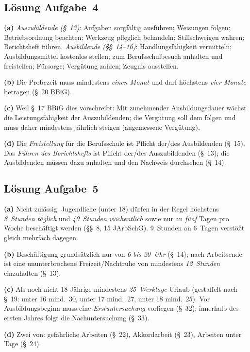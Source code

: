\documentclass[11pt, a4paper]{article}
\begin{document}
\subsection*{Lösung Aufgabe~4}
\begin{loesung}
\textbf{(a)} \emph{Auszubildende (\S~13)}: Aufgaben sorgfältig ausführen; Weisungen folgen;
Betriebsordnung beachten; Werkzeug pfleglich behandeln; Stillschweigen wahren; Berichtsheft
führen. \emph{Ausbildende (\S\S~14--16)}: Handlungsfähigkeit vermitteln; Ausbildungsmittel
kostenlos stellen; zum Berufsschulbesuch anhalten und freistellen; Fürsorge; Vergütung
zahlen; Zeugnis ausstellen.

\textbf{(b)} Die Probezeit muss mindestens \emph{einen Monat} und darf höchstens \emph{vier
Monate} betragen (\S~20 BBiG).

\textbf{(c)} Weil \S~17 BBiG dies vorschreibt: Mit zunehmender Ausbildungsdauer wächst die
Leistungsfähigkeit der Auszubildenden; die Vergütung soll dem folgen und muss daher
mindestens jährlich steigen (angemessene Vergütung).

\textbf{(d)} Die \emph{Freistellung} für die Berufsschule ist Pflicht der/des Ausbildenden
(\S~15). Das \emph{Führen des Berichtshefts} ist Pflicht der/des Auszubildenden (\S~13); die
Ausbildenden müssen dazu anhalten und den Nachweis durchsehen (\S~14).
\end{loesung}

\subsection*{Lösung Aufgabe~5}
\begin{loesung}
\textbf{(a)} Nicht zulässig. Jugendliche (unter 18) dürfen in der Regel höchstens
\emph{8~Stunden täglich} und \emph{40~Stunden wöchentlich} sowie nur an \emph{fünf} Tagen
pro Woche beschäftigt werden (\S\S~8, 15 JArbSchG). 9~Stunden an 6~Tagen verstößt gleich
mehrfach dagegen.

\textbf{(b)} Beschäftigung grundsätzlich nur von \emph{6 bis 20~Uhr} (\S~14); nach
Arbeitsende ist eine ununterbrochene Freizeit/Nachtruhe von mindestens \emph{12~Stunden}
einzuhalten (\S~13).

\textbf{(c)} Als noch nicht 18-Jährige mindestens \emph{25~Werktage} Urlaub (gestaffelt nach
\S~19: unter 16 mind.\ 30, unter 17 mind.\ 27, unter 18 mind.\ 25). Vor Ausbildungsbeginn
muss eine \emph{Erstuntersuchung} vorliegen (\S~32); innerhalb des ersten Jahres folgt die
Nachuntersuchung (\S~33).

\textbf{(d)} Zwei von: gefährliche Arbeiten (\S~22), Akkordarbeit (\S~23), Arbeiten unter
Tage (\S~24).
\end{loesung}
\end{document}
